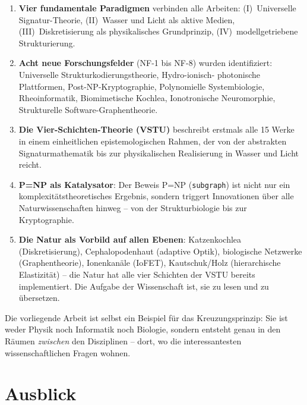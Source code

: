 ﻿\documentclass[a4paper,12pt]{scrreprt}
\theoremstyle{definition}
\begin{document}
\begin{enumerate}
  \item \textbf{Vier fundamentale Paradigmen} verbinden alle Arbeiten:
    (I)~Universelle Signatur-Theorie, (II)~Wasser und Licht als aktive
    Medien, (III)~Diskretisierung als physikalisches Grundprinzip,
    (IV)~modellgetriebene Strukturierung.

  \item \textbf{Acht neue Forschungsfelder} (NF-1 bis NF-8) wurden
    identifiziert: Universelle Strukturkodierungstheorie, Hydro-ionisch-
    photonische Plattformen, Post-NP-Kryptographie, Polynomielle
    Systembiologie, Rheoinformatik, Biomimetische Kochlea, Ionotronische
    Neuromorphie, Strukturelle Software-Graphentheorie.

  \item \textbf{Die Vier-Schichten-Theorie (VSTU)} beschreibt erstmals
    alle 15 Werke in einem einheitlichen epistemologischen Rahmen,
    der von der abstrakten Signaturmathematik bis zur physikalischen
    Realisierung in Wasser und Licht reicht.

  \item \textbf{P=NP als Katalysator}: Der Beweis P=NP (\texttt{subgraph})
    ist nicht nur ein komplexitätstheoretisches Ergebnis, sondern
    triggert Innovationen über alle Naturwissenschaften hinweg -- von der
    Strukturbiologie bis zur Kryptographie.

  \item \textbf{Die Natur als Vorbild auf allen Ebenen}: Katzenkochlea
    (Diskretisierung), Cephalopodenhaut (adaptive Optik), biologische
    Netzwerke (Graphentheorie), Ionenkanäle (IoFET), Kautschuk/Holz
    (hierarchische Elastizität) -- die Natur hat alle vier Schichten
    der VSTU bereits implementiert. Die Aufgabe der Wissenschaft ist,
    sie zu lesen und zu übersetzen.
\end{enumerate}

\bigskip
\noindent
Die vorliegende Arbeit ist selbst ein Beispiel für das Kreuzungsprinzip:
Sie ist weder Physik noch Informatik noch Biologie, sondern entsteht genau
in den Räumen \emph{zwischen} den Disziplinen -- dort, wo die interessantesten
wissenschaftlichen Fragen wohnen.

\section{Ausblick}
\label{sec:ausblick}
\end{document}
